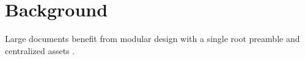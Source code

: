 \section{Background}
Large documents benefit from modular design with a single root preamble and centralized assets \parencite{lamport1986latex,knuth1990texbook}.
